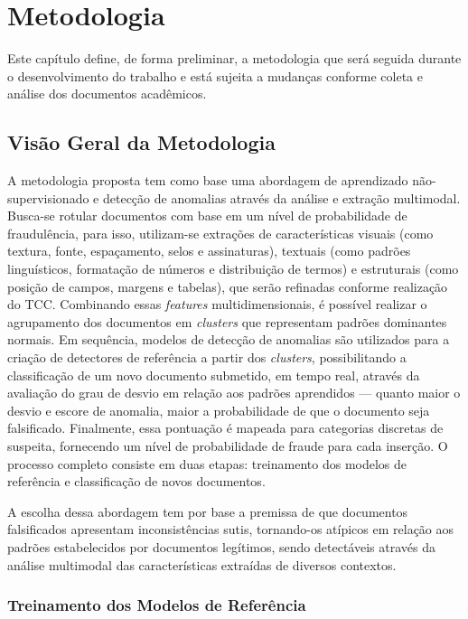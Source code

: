 \chapter{Metodologia}

Este capítulo define, de forma preliminar, a metodologia que será seguida durante o desenvolvimento do trabalho e está sujeita a mudanças conforme coleta e análise dos documentos acadêmicos.

\section{Visão Geral da Metodologia}

A metodologia proposta tem como base uma abordagem de aprendizado não-supervisionado e detecção de anomalias através da análise e extração multimodal. Busca-se rotular documentos com base em um nível de probabilidade de fraudulência, para isso, utilizam-se extrações de características visuais (como textura, fonte, espaçamento, selos e assinaturas), textuais (como padrões linguísticos, formatação de números e distribuição de termos) e estruturais (como posição de campos, margens e tabelas), que serão refinadas conforme realização do TCC. Combinando essas \textit{features} multidimensionais, é possível realizar o agrupamento dos documentos em \textit{clusters} que representam padrões dominantes normais. Em sequência, modelos de detecção de anomalias são utilizados para a criação de detectores de referência a partir dos \textit{clusters}, possibilitando a classificação de um novo documento submetido, em tempo real, através da avaliação do grau de desvio em relação aos padrões aprendidos — quanto maior o desvio e escore de anomalia, maior a probabilidade de que o documento seja falsificado. Finalmente, essa pontuação é mapeada para categorias discretas de suspeita, fornecendo um nível de probabilidade de fraude para cada inserção. O processo completo consiste em duas etapas: treinamento dos modelos de referência e classificação de novos documentos.

A escolha dessa abordagem tem por base a premissa de que documentos falsificados apresentam inconsistências sutis, tornando-os atípicos em relação aos padrões estabelecidos por documentos legítimos, sendo detectáveis através da análise multimodal das características extraídas de diversos contextos.

\subsection{Treinamento dos Modelos de Referência}

